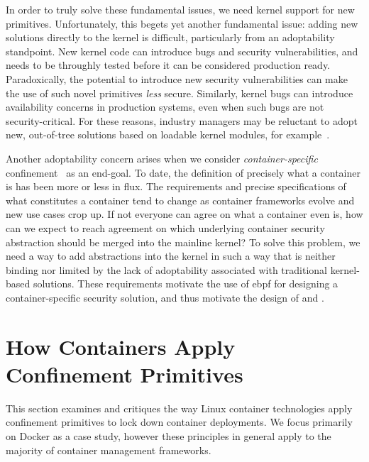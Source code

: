 \begin{enumerate}[font=\bfseries]
    In order to truly solve these fundamental issues, we need kernel support for new
    primitives. Unfortunately, this begets yet another fundamental issue: adding new
    solutions directly to the kernel is difficult, particularly from an adoptability
    standpoint. New kernel code can introduce bugs and security vulnerabilities, and needs
    to be throughly tested before it can be considered production ready. Paradoxically,
    the potential to introduce new security vulnerabilities can make the use of such novel
    primitives \textit{less} secure. Similarly, kernel bugs can introduce availability
    concerns in production systems, even when such bugs are not security-critical. For
    these reasons, industry managers may be reluctant to adopt new, out-of-tree solutions
    based on loadable kernel modules, for example~\cite{gregg2019_bpf}.

    Another adoptability concern arises when we consider \textit{container-specific}
    confinement~\cite{sultan2019_container_security, sun2018_security_namespace} as an
    end-goal.  To date, the definition of precisely what a container is has been more or
    less in flux. The requirements and precise specifications of what constitutes
    a container tend to change as container frameworks evolve and new use cases crop up.
    If not everyone can agree on what a container even is, how can we expect to reach
    agreement on which underlying container security abstraction should be merged into the
    mainline kernel? To solve this problem, we need a way to add abstractions into the
    kernel in such a way that is neither binding nor limited by the lack of adoptability
    associated with traditional kernel-based solutions. These requirements motivate the
    use of \gls{ebpf} for designing a container-specific security solution, and thus
    motivate the design of \bpfbox{} and \bpfcontain{}.
\end{enumerate}



\section{How Containers Apply Confinement Primitives}%
\label{s:cp-containers}

This section examines and critiques the way Linux container technologies apply confinement
primitives to lock down container deployments. We focus primarily on Docker as a case
study, however these principles in general apply to the majority of container management
frameworks.


